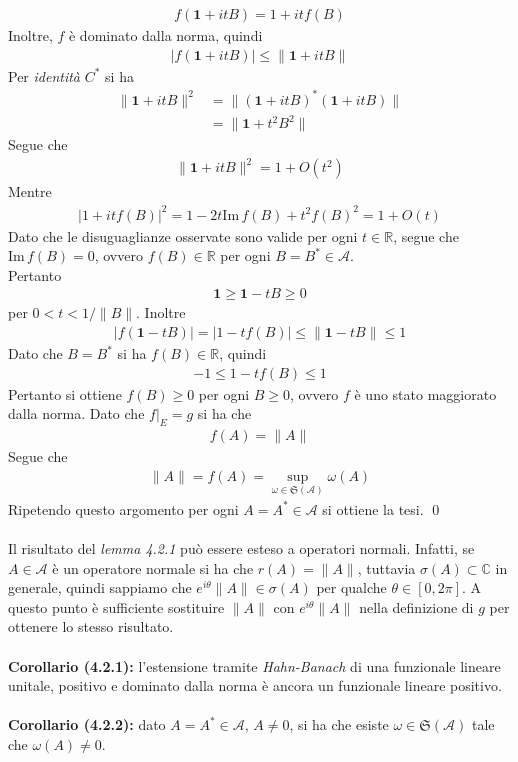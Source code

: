 \documentclass{article}
\numberwithin{equation}{subsection}
\begin{document}
\begin{align*}
    f(\mathbf{1} + itB) = 1 + itf(B)
\end{align*}
Inoltre, $f$ è dominato dalla norma, quindi
\begin{align*}
    |f(\mathbf{1} + itB)| \leq \|\mathbf{1} + itB\|
\end{align*}
Per \textit{identità} $C^*$ si ha
\begin{align*}
    \|\mathbf{1} + itB\|^2 &= \|(\mathbf{1} + itB)^*(\mathbf{1} + itB)\| \\
    &= \|\mathbf{1} + t^2B^2\|
\end{align*}
Segue che
\begin{align*}
    \|\mathbf{1} + itB\|^2 = 1 + O(t^2)
\end{align*}
Mentre
\begin{align*}
    |1 + itf(B)|^2 = 1 - 2t\mathrm{Im} \, f(B) + t^2f(B)^2 = 1 + O(t)
\end{align*}
Dato che le disuguaglianze osservate sono valide per ogni $t \in \mathbb{R}$, segue che $\mathrm{Im} \, f(B) = 0$, ovvero $f(B) \in \mathbb{R}$ per ogni $B = B^* \in \mathscr{A}$. \\
Pertanto
\begin{align*}
    \mathbf{1} \geq \mathbf{1} - tB \geq 0
\end{align*}
per $0 < t < 1/\|B\|$. Inoltre
\begin{align*}
    |f(\mathbf{1} - tB)| = |1 - tf(B)| \leq \|\mathbf{1} - tB\| \leq 1
\end{align*}
Dato che $B = B^*$ si ha $f(B) \in \mathbb{R}$, quindi
\begin{align*}
    -1 \leq 1 - tf(B) \leq 1
\end{align*}
Pertanto si ottiene $f(B) \geq 0$ per ogni $B \geq 0$, ovvero $f$ è uno stato maggiorato dalla norma. Dato che $f|_E = g$ si ha che
\begin{align*}
    f(A) = \|A\|
\end{align*}
Segue che
\begin{align*}
    \|A\| = f(A) = \sup_{\omega \in \mathfrak{S}(\mathscr{A})} \omega(A)
\end{align*}
Ripetendo questo argomento per ogni $A = A^* \in \mathscr{A}$ si ottiene la tesi. \qed \\ \\
Il risultato del \textit{lemma 4.2.1} può essere esteso a operatori normali. Infatti, se $A \in \mathscr{A}$ è un operatore normale si ha che $r(A) = \|A\|$, tuttavia $\sigma(A) \subset \mathbb{C}$ in generale, quindi sappiamo che $e^{i\theta}\|A\| \in \sigma(A)$ per qualche $\theta \in [0, 2\pi]$. A questo punto è sufficiente sostituire $\|A\|$ con $e^{i\theta}\|A\|$ nella definizione di $g$ per ottenere lo stesso risultato. \\ \\
\textbf{Corollario (4.2.1):} l'estensione tramite \textit{Hahn-Banach} di una funzionale lineare unitale, positivo e dominato dalla norma è ancora un funzionale lineare positivo. \\ \\
\textbf{Corollario (4.2.2):} dato $A = A^* \in \mathscr{A}$, $A \neq 0$, si ha che esiste $\omega \in \mathfrak{S}(\mathscr{A})$ tale che $\omega(A) \neq 0$.
\end{document}

